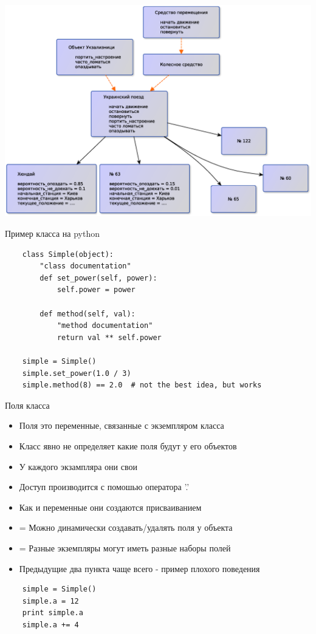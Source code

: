 \documentclass{article}
\begin{document}
\begin{center} \includegraphics[scale=0.8]{images/ukr_zalilnitsya.eps} \end{center}
\newpage

\begin{center} Пример класса на python \end{center}
\vspace{15pt}
\begin{lstlisting}
    class Simple(object):
        "class documentation"
        def set_power(self, power):
            self.power = power

        def method(self, val):
            "method documentation"
            return val ** self.power

    simple = Simple()
    simple.set_power(1.0 / 3)
    simple.method(8) == 2.0  # not the best idea, but works
\end{lstlisting}
\newpage

\begin{center} Поля класса \end{center}
\begin{itemize}
    \item Поля это переменные, связанные с экземпляром класса
    \item Класс явно не определяет какие поля будут у его объектов
    \item У каждого экзампляра они свои
    \item Доступ производится с помошью оператора '.'
    \item Как и переменные они создаются присваиванием
    \item = Можно динамически создавать/удалять поля у объекта
    \item = Разные экземпляры могут иметь разные наборы полей
    \item Предыдущие два пункта чаще всего - пример плохого поведения
\end{itemize}
\begin{lstlisting}
    simple = Simple()
    simple.a = 12
    print simple.a
    simple.a += 4
\end{lstlisting}
\newpage
\end{document}

